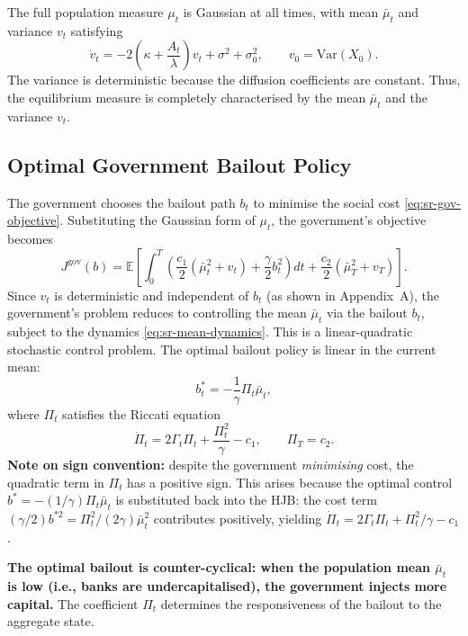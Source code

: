 The full population measure $\mu_t$ is Gaussian at all times, with mean $\bar\mu_t$
and variance $v_t$ satisfying
\begin{equation}
    \dot{v}_t = -2\left(\kappa + \frac{A_t}{\lambda}\right) v_t + \sigma^2 +
    \sigma_0^2, \qquad v_0 = \mathrm{Var}(X_0).
    \label{eq:sr-variance-dynamics}
\end{equation}
The variance is deterministic because the diffusion coefficients are constant.
Thus, the equilibrium measure is completely characterised by the mean $\bar\mu_t$
and the variance $v_t$.

\subsection{Optimal Government Bailout Policy}

The government chooses the bailout path $b_t$ to minimise the social cost
\eqref{eq:sr-gov-objective}. Substituting the Gaussian form of $\mu_t$, the
government's objective becomes
\[
    J^{\mathrm{gov}}(b) = \mathbb{E}\left[ \int_0^T \left( \frac{c_1}{2}(\bar\mu_t^2
    + v_t) + \frac{\gamma}{2} b_t^2 \right) dt + \frac{c_2}{2}(\bar\mu_T^2 + v_T)
    \right].
\]
Since $v_t$ is deterministic and independent of $b_t$ (as shown in Appendix~A), the
government's problem reduces to controlling the mean $\bar\mu_t$ via the bailout
$b_t$, subject to the dynamics \eqref{eq:sr-mean-dynamics}. This is a
linear-quadratic stochastic control problem. The optimal bailout policy is linear in
the current mean:
\begin{equation}
    b_t^* = -\frac{1}{\gamma} \Pi_t \bar\mu_t,
    \label{eq:sr-optimal-bailout}
\end{equation}
where $\Pi_t$ satisfies the Riccati equation
\begin{equation}
    \dot{\Pi}_t = 2\Gamma_t \Pi_t + \frac{\Pi_t^2}{\gamma} - c_1, \qquad \Pi_T = c_2.
    \label{eq:sr-gov-riccati}
\end{equation}
\textbf{Note on sign convention:} despite the government \emph{minimising} cost,
the quadratic term in $\Pi_t$ has a positive sign. This arises because the optimal
control $b^* = -(1/\gamma)\Pi_t\bar\mu_t$ is substituted back into the HJB: the
cost term $(\gamma/2)b^{*2} = \Pi_t^2/(2\gamma)\bar\mu_t^2$ contributes positively,
yielding $\dot\Pi_t = 2\Gamma_t\Pi_t + \Pi_t^2/\gamma - c_1$.

\textbf{The optimal bailout is counter-cyclical: when the population mean
$\bar\mu_t$ is low (i.e., banks are undercapitalised), the government injects more
capital.} The coefficient $\Pi_t$ determines the responsiveness of the bailout to
the aggregate state.

